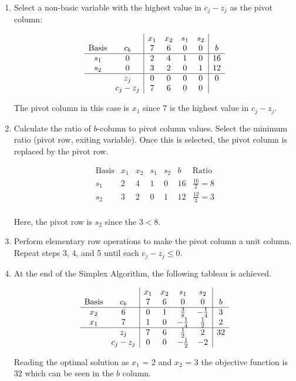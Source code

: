 \begin{enumerate}
    \item Select a non-basic variable with the highest value in \(c_j - z_j\) as the pivot column:

    \[
    \begin{array}{cc|cccc|c}
        & & x_1 & x_2 & s_1 & s_2 & \\
        \text{Basis} & c_b & 7  & 6 & 0 & 0 & b\\
        \hline
        s_1 & 0 &  2 & 4 & 1 & 0 & 16 \\
        s_2 & 0 &  3 & 2 & 0 & 1 & 12 \\
        \hline
        & z_j & 0 & 0 & 0 & 0 & 0 \\
        & c_j - z_j & 7 & 6 & 0 & 0  \\
    \end{array}
    \]

    The pivot column in this case is \(x_1\) since 7 is the highest value in $c_j - z_j$.

    \item Calculate the ratio of \(b\)-column to pivot column values. Select the minimum ratio (pivot row, exiting variable). Once this is selected, the pivot column is replaced by the pivot row. 
 
    \[
    \begin{array}{c|cccc|c|c}
        \text{Basis} & x_1 & x_2 & s_1 & s_2 & b & \text{Ratio} \\
        \hline
        s_1 & 2 & 4 & 1 & 0 & 16 & \frac{16}{2} = 8 \\
        s_2 & 3 & 2 & 0 & 1 & 12 &  \frac{12}{3} = 3\\
    \end{array}
    \]

    Here, the pivot row is \(s_2\) since the $3 < 8$.

    \item Perform elementary row operations to make the pivot column a unit column. Repeat steps 3, 4, and 5 until each \(c_j - z_j \leq 0\).


    \item At the end of the Simplex Algorithm, the following tableau is achieved.

    \[
    \begin{array}{cc|cccc|c}
        & & x_1 & x_2 & s_1 & s_2  \\
        \text{Basis} & c_b & 7  & 6 & 0 & 0 & b\\
        \hline
        x_2 & 6 &  0 & 1 & \frac{3}{8} & -\frac{1}{4} & 3 \\
        x_1 & 7 &  1 & 0 & -\frac{1}{4} & \frac{1}{2} & 2 \\
        \hline
        & z_j & 7 & 6 & \frac{1}{2} & 2 & 32 \\
        & c_j - z_j & 0 & 0 & -\frac{1}{2} & -2  \\
    \end{array}
    \]

    Reading the optimal solution as $x_1$ = 2 and $x_2$ = 3 the objective function is $32$ which can be seen in the $b$ column.
\end{enumerate}


